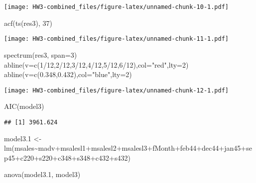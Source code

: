 \documentclass[
]{article}
\newenvironment{Shaded}{\begin{snugshade}}{\end{snugshade}}
\newcommand{\AttributeTok}[1]{\textcolor[rgb]{0.77,0.63,0.00}{#1}}
\newcommand{\DecValTok}[1]{\textcolor[rgb]{0.00,0.00,0.81}{#1}}
\newcommand{\FloatTok}[1]{\textcolor[rgb]{0.00,0.00,0.81}{#1}}
\newcommand{\FunctionTok}[1]{\textcolor[rgb]{0.00,0.00,0.00}{#1}}
\newcommand{\NormalTok}[1]{#1}
\newcommand{\OtherTok}[1]{\textcolor[rgb]{0.56,0.35,0.01}{#1}}
\newcommand{\SpecialCharTok}[1]{\textcolor[rgb]{0.00,0.00,0.00}{#1}}
\newcommand{\StringTok}[1]{\textcolor[rgb]{0.31,0.60,0.02}{#1}}
\begin{document}
\texttt{[image: HW3-combined\_files/figure-latex/unnamed-chunk-10-1.pdf]}

\begin{Shaded}
\begin{Highlighting}[]
\FunctionTok{acf}\NormalTok{(}\FunctionTok{ts}\NormalTok{(res3), }\DecValTok{37}\NormalTok{)}
\end{Highlighting}
\end{Shaded}

\texttt{[image: HW3-combined\_files/figure-latex/unnamed-chunk-11-1.pdf]}

\begin{Shaded}
\begin{Highlighting}[]
\FunctionTok{spectrum}\NormalTok{(res3, }\AttributeTok{span=}\DecValTok{3}\NormalTok{)}
\FunctionTok{abline}\NormalTok{(}\AttributeTok{v=}\FunctionTok{c}\NormalTok{(}\DecValTok{1}\SpecialCharTok{/}\DecValTok{12}\NormalTok{,}\DecValTok{2}\SpecialCharTok{/}\DecValTok{12}\NormalTok{,}\DecValTok{3}\SpecialCharTok{/}\DecValTok{12}\NormalTok{,}\DecValTok{4}\SpecialCharTok{/}\DecValTok{12}\NormalTok{,}\DecValTok{5}\SpecialCharTok{/}\DecValTok{12}\NormalTok{,}\DecValTok{6}\SpecialCharTok{/}\DecValTok{12}\NormalTok{),}\AttributeTok{col=}\StringTok{"red"}\NormalTok{,}\AttributeTok{lty=}\DecValTok{2}\NormalTok{)}
\FunctionTok{abline}\NormalTok{(}\AttributeTok{v=}\FunctionTok{c}\NormalTok{(}\FloatTok{0.348}\NormalTok{,}\FloatTok{0.432}\NormalTok{),}\AttributeTok{col=}\StringTok{"blue"}\NormalTok{,}\AttributeTok{lty=}\DecValTok{2}\NormalTok{)}
\end{Highlighting}
\end{Shaded}

\texttt{[image: HW3-combined\_files/figure-latex/unnamed-chunk-12-1.pdf]}

\begin{Shaded}
\begin{Highlighting}[]
\FunctionTok{AIC}\NormalTok{(model3)}
\end{Highlighting}
\end{Shaded}

\begin{verbatim}
## [1] 3961.624
\end{verbatim}

\begin{Shaded}
\begin{Highlighting}[]
\NormalTok{model3}\FloatTok{.1} \OtherTok{\textless{}{-}} \FunctionTok{lm}\NormalTok{(msales}\SpecialCharTok{\textasciitilde{}}\NormalTok{madv}\SpecialCharTok{+}\NormalTok{msalesl1}\SpecialCharTok{+}\NormalTok{msalesl2}\SpecialCharTok{+}\NormalTok{msalesl3}\SpecialCharTok{+}\NormalTok{fMonth}\SpecialCharTok{+}\NormalTok{feb44}\SpecialCharTok{+}\NormalTok{dec44}\SpecialCharTok{+}\NormalTok{jan45}\SpecialCharTok{+}\NormalTok{sep45}\SpecialCharTok{+}\NormalTok{c220}\SpecialCharTok{+}\NormalTok{s220}\SpecialCharTok{+}\NormalTok{c348}\SpecialCharTok{+}\NormalTok{s348}\SpecialCharTok{+}\NormalTok{c432}\SpecialCharTok{+}\NormalTok{s432)}

\FunctionTok{anova}\NormalTok{(model3}\FloatTok{.1}\NormalTok{, model3)}
\end{Highlighting}
\end{Shaded}
\end{document}
